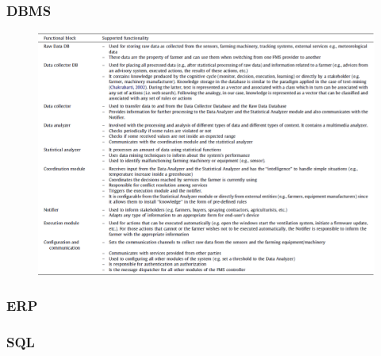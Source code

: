 \documentclass[
	11pt, %
]{beamer}
\begin{document}
\begin{frame}
	\frametitle{DBMS}
	\begin{figure}
		\includegraphics[width=0.8\linewidth]{images/figure10.png}
		\label{fig: Kaloxylos et al. 2012}
	\end{figure}
\end{frame}

\begin{frame}
	\frametitle{ERP}

\end{frame}

\begin{frame}
	\frametitle{SQL}

\end{frame}

\end{document}
